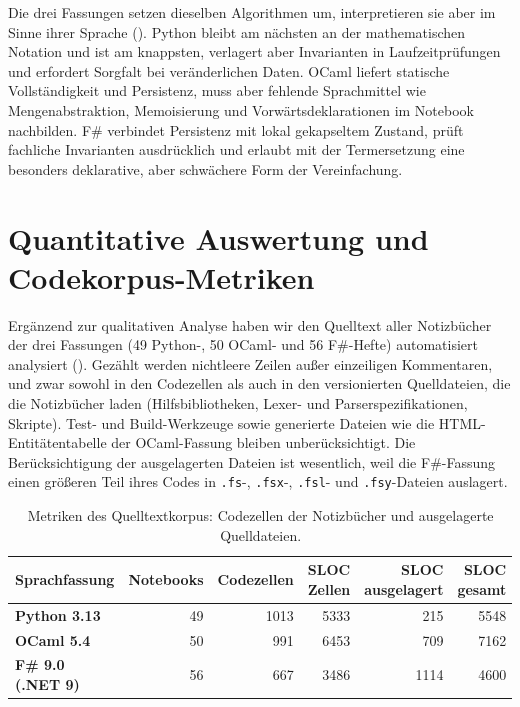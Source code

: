 \begin{finding}
Die drei Fassungen setzen dieselben Algorithmen um, interpretieren sie aber im Sinne ihrer Sprache ().
Python bleibt am nächsten an der mathematischen Notation und ist am knappsten, verlagert aber Invarianten in Laufzeitprüfungen und erfordert Sorgfalt bei veränderlichen Daten.
OCaml liefert statische Vollständigkeit und Persistenz, muss aber fehlende Sprachmittel wie Mengenabstraktion, Memoisierung und Vorwärtsdeklarationen im Notebook nachbilden.
F\# verbindet Persistenz mit lokal gekapseltem Zustand, prüft fachliche Invarianten ausdrücklich und erlaubt mit der Termersetzung eine besonders deklarative, aber schwächere Form der Vereinfachung.
\end{finding}

\section{Quantitative Auswertung und Codekorpus-Metriken}
\label{sec:corpus_metrics}

Ergänzend zur qualitativen Analyse haben wir den Quelltext aller Notizbücher der drei Fassungen (49 Python-, 50 OCaml- und 56 F\#-Hefte) automatisiert analysiert ().
Gezählt werden nichtleere Zeilen außer einzeiligen Kommentaren, und zwar sowohl in den Codezellen als auch in den versionierten Quelldateien, die die Notizbücher laden (Hilfsbibliotheken, Lexer- und Parserspezifikationen, Skripte).
Test- und Build-Werkzeuge sowie generierte Dateien wie die HTML-Entitätentabelle der OCaml-Fassung bleiben unberücksichtigt.
Die Berücksichtigung der ausgelagerten Dateien ist wesentlich, weil die F\#-Fassung einen größeren Teil ihres Codes in \texttt{.fs}-, \texttt{.fsx}-, \texttt{.fsl}- und \texttt{.fsy}-Dateien auslagert.

\begin{table}[htbp]
  \centering
  \small
  \caption{Metriken des Quelltextkorpus: Codezellen der Notizbücher und ausgelagerte Quelldateien.}
  \label{tab:expressiveness_metrics}
  \begin{tabularx}{\textwidth}{Xrrrrr}
    \toprule
    \textbf{Sprachfassung} & \textbf{Notebooks} & \textbf{Codezellen} & \makecell[r]{\textbf{SLOC}\\\textbf{Zellen}} & \makecell[r]{\textbf{SLOC}\\\textbf{ausgelagert}} & \makecell[r]{\textbf{SLOC}\\\textbf{gesamt}} \\
    \midrule
    \textbf{Python 3.13} & 49 & 1013 & 5333 & 215 & 5548 \\
    \textbf{OCaml 5.4}   & 50 & 991 & 6453 & 709 & 7162 \\
    \textbf{F\# 9.0 (.NET 9)} & 56 & 667 & 3486 & 1114 & 4600 \\
    \bottomrule
  \end{tabularx}
\end{table}

